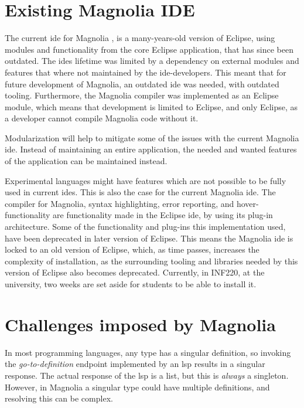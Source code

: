 \section{Existing Magnolia IDE}

The current \gls{ide} for Magnolia \cite{baggeIde}, is a many-years-old version
of Eclipse, using modules and functionality from the core Eclipse application,
that has since been outdated. The \gls{ide}s lifetime was limited by a
dependency on external modules and features that where not maintained by the
\gls{ide}-developers. This meant that for future development of Magnolia, an
outdated \gls{ide} was needed, with outdated tooling. Furthermore, the Magnolia
compiler was implemented as an Eclipse module, which means that development is
limited to Eclipse, and only Eclipse, as a developer cannot compile Magnolia
code without it.

Modularization will help to mitigate some of the issues with the current
Magnolia \gls{ide}. Instead of maintaining an entire application, the needed and
wanted features of the application can be maintained instead.

Experimental languages might have features which are not possible to be fully
used in current \gls{ide}s. This is also the case for the current Magnolia
\gls{ide}. The compiler for Magnolia, syntax highlighting, error reporting, and
hover-functionality are functionality made in the Eclipse \gls{ide}, by using
its plug-in architecture. Some of the functionality and plug-ins this
implementation used, have been deprecated in later version of Eclipse. This
means the Magnolia \gls{ide} is locked to an old version of Eclipse, which, as
time passes, increases the complexity of installation, as the surrounding
tooling and libraries needed by this version of Eclipse also becomes deprecated.
Currently, in INF220, at the university, two weeks are set aside for students to
be able to install it.

\section{Challenges imposed by Magnolia}

In most programming languages, any type has a singular definition, so invoking
the \textit{go-to-definition} endpoint implemented by an \gls{lsp} results in a
singular response. The actual response of the \gls{lsp} is a list, but this is
\textit{always} a singleton. However, in Magnolia a singular type could have
multiple definitions, and resolving this can be complex.

